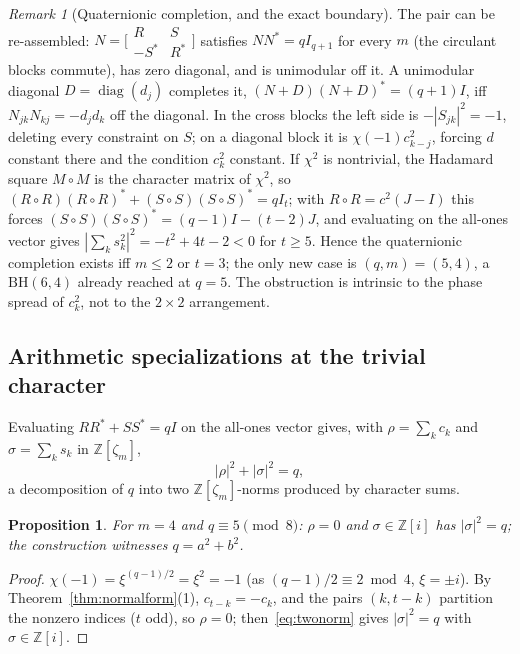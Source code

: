 \documentclass[11pt]{article}
\theoremstyle{plain}
\newtheorem{proposition}[theorem]{Proposition}
\theoremstyle{definition}
\theoremstyle{remark}
\newtheorem{remark}[theorem]{Remark}
\newcommand{\Z}{\mathbb Z}
\begin{document}
\begin{remark}[Quaternionic completion, and the exact boundary]\label{rem:quat}
The pair can be re-assembled: $N=\bigl[\begin{smallmatrix}R&S\\
-S^*&R^*\end{smallmatrix}\bigr]$ satisfies $NN^*=qI_{q+1}$ for every $m$ (the
circulant blocks commute), has zero diagonal, and is unimodular off it. A
unimodular diagonal $D=\operatorname{diag}(d_j)$ completes it,
$(N+D)(N+D)^*=(q+1)I$, iff $N_{jk}N_{kj}=-d_jd_k$ off the diagonal. In the cross
blocks the left side is $-|S_{jk}|^2=-1$, deleting every constraint on $S$; on a
diagonal block it is $\chi(-1)c_{k-j}^2$, forcing $d$ constant there and the
condition $c_k^2$ constant. If $\chi^2$ is nontrivial, the Hadamard square
$M\circ M$ is the character matrix of $\chi^2$, so
$(R\circ R)(R\circ R)^*+(S\circ S)(S\circ S)^*=qI_t$; with $R\circ R=c^2(J-I)$
this forces $(S\circ S)(S\circ S)^*=(q-1)I-(t-2)J$, and evaluating on the
all-ones vector gives $|\sum_k s_k^2|^2=-t^2+4t-2<0$ for $t\ge5$. Hence the
quaternionic completion exists iff $m\le2$ or $t=3$; the only new case is
$(q,m)=(5,4)$, a $\mathrm{BH}(6,4)$ already reached at $q=5$. The obstruction is
intrinsic to the phase spread of $c_k^2$, not to the $2\times2$ arrangement.
\end{remark}

\subsection{Arithmetic specializations at the trivial character}

Evaluating $RR^*+SS^*=qI$ on the all-ones vector gives, with $\rho=\sum_k c_k$
and $\sigma=\sum_k s_k$ in $\Z[\zeta_m]$,
\begin{equation}\label{eq:twonorm}
  |\rho|^2+|\sigma|^2=q,
\end{equation}
a decomposition of $q$ into two $\Z[\zeta_m]$-norms produced by character sums.

\begin{proposition}\label{prop:twosquaresm4}
For $m=4$ and $q\equiv5\pmod8$: $\rho=0$ and $\sigma\in\Z[i]$ has $|\sigma|^2=q$;
the construction witnesses $q=a^2+b^2$.
\end{proposition}

\begin{proof}
$\chi(-1)=\xi^{(q-1)/2}=\xi^2=-1$ (as $(q-1)/2\equiv2\bmod4$, $\xi=\pm i$). By
Theorem~\ref{thm:normalform}(1), $c_{t-k}=-c_k$, and the pairs $(k,t-k)$
partition the nonzero indices ($t$ odd), so $\rho=0$; then~\eqref{eq:twonorm}
gives $|\sigma|^2=q$ with $\sigma\in\Z[i]$.
\end{proof}
\end{document}

